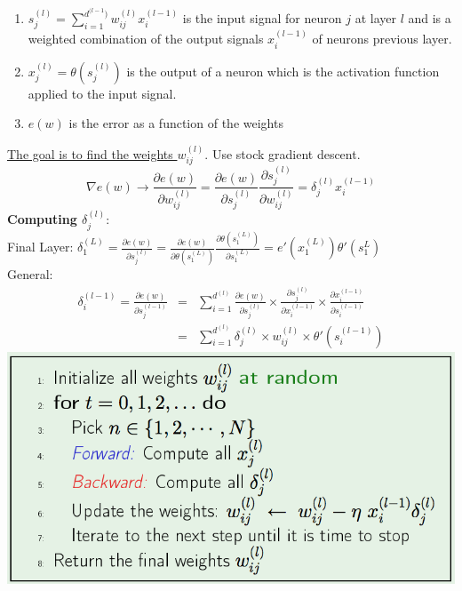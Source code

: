 \documentclass[3pt,landscape]{article}
\begin{document}
\begin{multicols}{3}
\begin{enumerate}
\item \(s_j^{(l)} = \sum_{i=1}^{d^{(l-1})} w_{ij}^{(l)} x_i^{(l-1)}\) is the input signal for neuron $j$ at layer $l$ and is a weighted combination of the output signals $x_i^{(l-1)}$ of neurons previous layer.
\item \(x_j^{(l)} = \theta(s_j^{(l)})\) is the output of a neuron which is the activation function applied to the input signal.
\item $e(w)$ is the error as a function of the weights
\end{enumerate}
\underline{The goal is to find the weights $w_{ij}^{(l)}$}. Use stock gradient descent.
\[\nabla e(w) \rightarrow \frac{\partial e(w)}{\partial w_{ij}^{(l)}} = \frac{\partial e(w)}{\partial s_{j}^{(l)}} \frac{\partial s_{j}^{(l)}}{\partial w_{ij}^{(l)}} = \delta_j^{(l)}x_i^{(l-1)}\]
{\bf Computing $\delta_j^{(l)}$}:\\
Final Layer: \(\delta_1^{(L)} = \frac{\partial e(w)}{\partial s_{j}^{(l)}} = \frac{\partial e(w)}{\partial \theta(s_1^{(L)})} \frac{\partial \theta(s_1^{(L)})}{\partial s_{1}^{(L)}} = e'(x_1^{(L)}) \theta'(s_1^{L})\) \\
General: \begin{eqnarray*} \delta_i^{(l-1)} = \frac{\partial e(w)}{\partial s_{j}^{(l-1)}} &=& \sum_{i=1}^{d^{(l)}} \frac{\partial e(w)}{\partial s_{j}^{(l)}} \times \frac{\partial s_{j}^{(l)}}{\partial x_i^{(l-1)}} \times \frac{\partial x_i^{(l-1)}}{\partial s_i^{(l-1)}} \\
&=&  \sum_{i=1}^{d^{(l)}} \delta_j^{(l)} \times w_{ij}^{(l)} \times \theta'(s_i^{(l-1)}) \end{eqnarray*}
\includegraphics[scale=0.28]{NN1.pdf}


\end{multicols}
\end{document}
